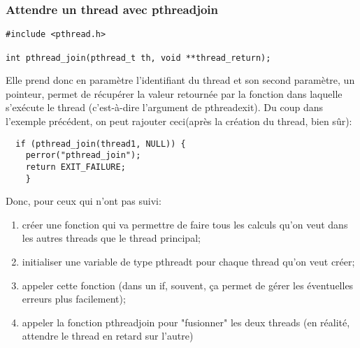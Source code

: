 \documentclass[a4paper]{article}
\begin{document}
\subsubsection{Attendre un thread avec pthread\textunderscore{}join}
\begin{lstlisting}
#include <pthread.h>

int pthread_join(pthread_t th, void **thread_return);
\end{lstlisting}
Elle prend donc en paramètre l'identifiant du thread et son second paramètre, un pointeur, permet de récupérer la valeur retournée par la fonction dans laquelle s'exécute le thread (c'est-à-dire l'argument de pthread\textunderscore{}exit).\newline
Du coup dans l'exemple précédent, on peut rajouter ceci(après la création du thread, bien sûr):
\begin{lstlisting}
  if (pthread_join(thread1, NULL)) {
    perror("pthread_join");
    return EXIT_FAILURE;
    }
\end{lstlisting}
Donc, pour ceux qui n'ont pas suivi:
\begin{enumerate}
  \item créer une fonction qui va permettre de faire tous les calculs qu'on veut dans les autres threads que le thread principal;
  \item initialiser une variable de type pthread\textunderscore{}t pour chaque thread qu'on veut créer;
  \item appeler cette fonction (dans un if, souvent, ça permet de gérer les éventuelles erreurs plus facilement);
  \item appeler la fonction pthread\textunderscore{}join pour "fusionner" les deux threads (en réalité, attendre le thread en retard sur l'autre)
\end{enumerate}
\end{document}
